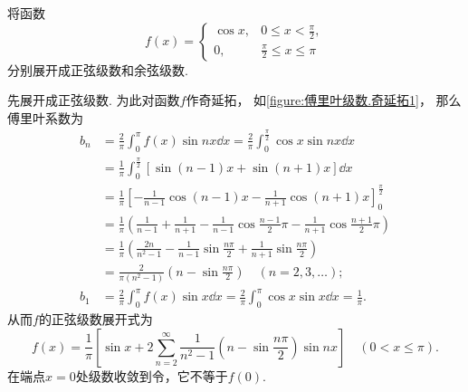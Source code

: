 \begin{example}
将函数\begin{equation*}
	f(x) = \left\{ \begin{array}{cc}
		\cos x, & 0 \leq x < \frac{\pi}{2}, \\
		0, & \frac{\pi}{2} \leq x \leq \pi
	\end{array} \right.
\end{equation*}分别展开成正弦级数和余弦级数.
\begin{solution}
先展开成正弦级数.
为此对函数\(f\)作奇延拓，
如\cref{figure:傅里叶级数.奇延拓1}，
那么傅里叶系数为\begin{align*}
	b_n &= \frac{2}{\pi} \int_0^\pi f(x) \sin nx \dd{x}
	= \frac{2}{\pi}
		\int_0^{\frac{\pi}{2}} \cos x \sin nx \dd{x} \\
	&= \frac{1}{\pi}
		\int_0^{\frac{\pi}{2}} [\sin(n-1)x + \sin(n+1)x] \dd{x} \\
	&= \frac{1}{\pi}
		\left[
			-\frac{1}{n-1} \cos(n-1)x - \frac{1}{n+1} \cos(n+1)x
		\right]_0^{\frac{\pi}{2}} \\
	&= \frac{1}{\pi}
		\left(
			\frac{1}{n-1}
			+ \frac{1}{n+1}
			- \frac{1}{n-1} \cos\frac{n-1}{2}\pi
			- \frac{1}{n+1} \cos\frac{n+1}{2}\pi
		\right) \\
	&= \frac{1}{\pi}
		\left(
			\frac{2n}{n^2-1}
			- \frac{1}{n-1}
			\sin\frac{n\pi}{2}
			+ \frac{1}{n+1}\sin\frac{n\pi}{2}
		\right) \\
	&= \frac{2}{\pi(n^2-1)} \left(n-\sin\frac{n\pi}{2}\right)
		\quad(n=2,3,\dotsc); \\
	b_1 &= \frac{2}{\pi} \int_0^\pi f(x) \sin x \dd{x}
	= \frac{2}{\pi} \int_0^\pi \cos x \sin x \dd{x} = \frac{1}{\pi}.
\end{align*}
从而\(f\)的正弦级数展开式为\begin{equation*}
f(x) = \frac{1}{\pi} \left[
		\sin x
		+ 2\sum_{n=2}^\infty
			\frac{1}{n^2-1} \left(n-\sin\frac{n\pi}{2}\right) \sin nx
	\right]
	\quad(0 < x \leq \pi).
\end{equation*}
在端点\(x=0\)处级数收敛到令，它不等于\(f(0)\).


\end{solution}
\end{example}
